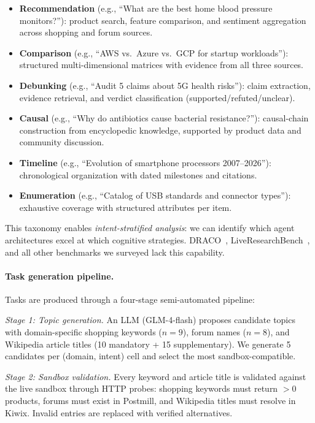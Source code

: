 \documentclass{article}
\begin{document}
\begin{itemize}[leftmargin=*,itemsep=2pt]
\item \textbf{Recommendation} (e.g., ``What are the best home blood pressure monitors?''): product search, feature comparison, and sentiment aggregation across shopping and forum sources.
\item \textbf{Comparison} (e.g., ``AWS vs.\ Azure vs.\ GCP for startup workloads''): structured multi-dimensional matrices with evidence from all three sources.
\item \textbf{Debunking} (e.g., ``Audit 5 claims about 5G health risks''): claim extraction, evidence retrieval, and verdict classification (supported/refuted/unclear).
\item \textbf{Causal} (e.g., ``Why do antibiotics cause bacterial resistance?''): causal-chain construction from encyclopedic knowledge, supported by product data and community discussion.
\item \textbf{Timeline} (e.g., ``Evolution of smartphone processors 2007--2026''): chronological organization with dated milestones and citations.
\item \textbf{Enumeration} (e.g., ``Catalog of USB standards and connector types''): exhaustive coverage with structured attributes per item.
\end{itemize}

This taxonomy enables \emph{intent-stratified analysis}: we can identify which agent architectures excel at which cognitive strategies. DRACO~\citep{draco2026}, LiveResearchBench~\citep{liveresearchbench2026}, and all other benchmarks we surveyed lack this capability.

\paragraph{Task generation pipeline.} Tasks are produced through a four-stage semi-automated pipeline:

\textit{Stage 1: Topic generation.} An LLM (GLM-4-flash) proposes candidate topics with domain-specific shopping keywords ($n{=}9$), forum names ($n{=}8$), and Wikipedia article titles (10 mandatory + 15 supplementary). We generate 5 candidates per (domain, intent) cell and select the most sandbox-compatible.

\textit{Stage 2: Sandbox validation.} Every keyword and article title is validated against the live sandbox through HTTP probes: shopping keywords must return $>$0 products, forums must exist in Postmill, and Wikipedia titles must resolve in Kiwix. Invalid entries are replaced with verified alternatives.
\end{document}
